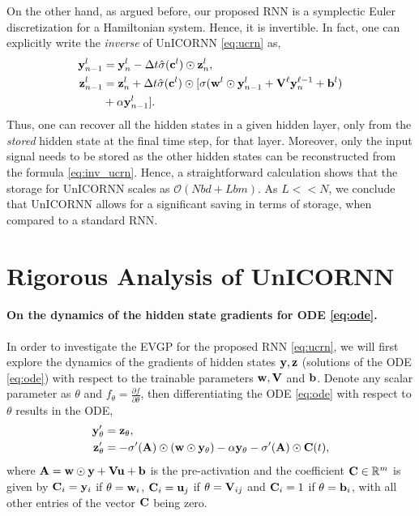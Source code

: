 \documentclass{article}
\newcommand{\by}{{\bf y}}
\newcommand{\bz}{{\bf z}}
\newcommand{\bw}{{\bf w}}
\newcommand{\bu}{{\bf u}}
\newcommand{\bb}{{\bf b}}
\newcommand{\bV}{{\bf V}}
\newcommand{\bA}{{\bf A}}
\newcommand{\bC}{{\bf C}}
\newcommand{\bc}{{\bf c}}
\newcommand{\R}{{\mathbb R}}
\newcommand{\Dt}{{\Delta t}}
\begin{document}
On the other hand, as argued before, our proposed RNN is a symplectic Euler discretization for a Hamiltonian system. Hence, it is invertible. In fact, one can explicitly write the \emph{inverse} of UnICORNN \eqref{eq:ucrn} as,
\begin{align}
\label{eq:inv_ucrn}
\begin{aligned} 
\by_{n-1}^l &= \by_{n}^l - \Dt\hat{\sigma}(\bc^l)\odot \bz_n^l, \\
\bz_{n-1}^l &= \bz_{n}^l + \Dt\hat{\sigma}(\bc^l)\odot[\sigma(\bw^l \odot \by_{n-1}^l + \bV^\ell \by_n^{\ell-1} + \bb^l ) \\&+\alpha \by_{n-1}^l].
\end{aligned}
\end{align}
Thus, one can recover all the hidden states in a given hidden layer, only from the \emph{stored} hidden state at the final time step, for that layer. Moreover, only the input signal needs to be stored as the other hidden states can be reconstructed from the formula \eqref{eq:inv_ucrn}. Hence, a straightforward calculation shows that the storage for UnICORNN scales as $\mathcal{O}(Nbd + Lbm)$. As $L << N$, we conclude that UnICORNN allows for a significant saving in terms of storage, when compared to a standard RNN. 
\section{Rigorous Analysis of UnICORNN}
\paragraph{On the dynamics of the hidden state gradients for ODE \eqref{eq:ode}.}
In order to investigate the EVGP for the proposed RNN \eqref{eq:ucrn}, we will first explore the dynamics of the gradients of hidden states $\by,\bz$ (solutions of the ODE \eqref{eq:ode}) with respect to the trainable parameters $\bw,\bV$ and $\bb$. Denote any scalar parameter as $\theta$ and $f_\theta = \frac{\partial f}{\partial \theta}$, then differentiating the ODE \eqref{eq:ode} with respect to $\theta$ results in the ODE,
\begin{align}
    \label{eq:hsg}
    \begin{aligned}
    \by_{\theta}^{\prime} &= \bz_{\theta}, \\ \bz_{\theta}^{\prime} &= -\sigma^{\prime}(\bA) \odot \left(\bw \odot \by_{\theta}\right) -\alpha \by_{\theta}-\sigma^{\prime}(\bA) \odot\bC(t),
\end{aligned}
\end{align}
where $\bA=\bw \odot \by + \bV \bu + \bb$ is the pre-activation and the coefficient $\bC \in \R^m$ is given by $\bC_i = \by_i$ if $\theta = \bw_i$,  $\bC_i = \bu_{j}$ if $\theta = \bV_{ij}$ and $\bC_i = 1$ if $\theta = \bb_i$, with all other entries of the vector $\bC$ being zero.
\end{document}
